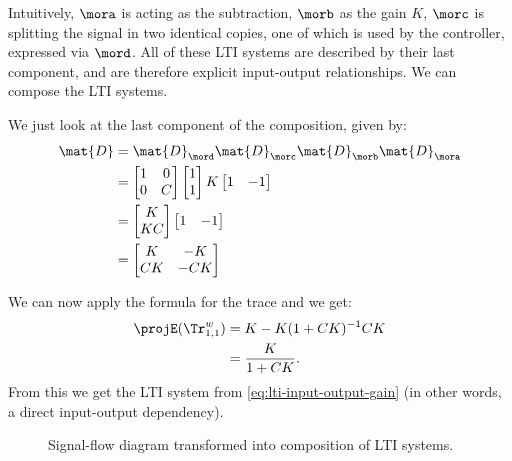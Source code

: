\begin{example}
    Intuitively, $\mora$ is acting as the subtraction, $\morb$ as the gain $K$, $\morc$ is splitting the signal in two identical copies, one of which is used by the controller, expressed via $\mord$.
    All of these LTI systems are described by their last component, and are therefore explicit input-output relationships.
    We can compose the LTI systems.

    We just look at the last component of the composition, given by:
    \begin{equation*}
        \begin{aligned}
            \mat{D} & =\mat{D}_\mord \mat{D}_\morc \mat{D}_\morb \mat{D}_\mora \\
                    & =\begin{bmatrix}1 & 0\\ 0 & {C}\end{bmatrix} \begin{bmatrix} 1\\ 1 \end{bmatrix} K \begin{bmatrix} 1 & -1 \end{bmatrix} \\
                    & =\begin{bmatrix}K \\ {KC}\end{bmatrix}\begin{bmatrix} 1 & -1 \end{bmatrix} \\
                    & =\begin{bmatrix}
                           K  & -K  \\
                           CK & -CK
                       \end{bmatrix}
        \end{aligned}
    \end{equation*}

    We can now apply the formula for the trace and we get:
    \begin{equation*}
        \begin{aligned}
            \projE(\Tr_{1,1}^{w}) & =K - K(1+CK)^{-1}
            CK \\
                                  & =\frac{K}{1+CK}.
        \end{aligned}
    \end{equation*}
    From this we get the LTI system from \cref{eq:lti-input-output-gain} (in other words, a direct input-output dependency).

    \begin{marginfigure}
        \begin{center}
        \end{center}
        \caption{Example with signal-flow diagram.}
        \label{fig:lti-ex-signalflow}
    \end{marginfigure}
\end{example}

\begin{figure}
    \centering
    \caption{Signal-flow diagram transformed into composition of LTI systems.}
    \label{fig:lti-ex-signalflow-bis}
\end{figure}
